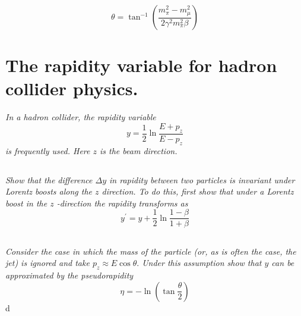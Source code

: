 \documentclass{article}
\begin{document}
$$\boxed{\theta=\tan ^{-1}\left(\frac{m_{\pi}^{2}-m_{\mu}^{2}}{2 \gamma^{2} m_{\pi}^{2} \beta}\right)}$$

\newpage


\section{The rapidity variable for hadron collider physics.}
\textit{In a hadron collider, the rapidity variable
$$
y=\frac{1}{2} \ln \frac{E+p_{z}}{E-p_{z}}
$$
is frequently used. Here $z$ is the beam direction.}


\subsection{}
\textit{Show that the difference $\Delta y$ in rapidity between two particles is invariant under Lorentz boosts along the $z$ direction. To do this, first show that under a Lorentz boost in the $z$ -direction the rapidity transforms as
$$
y^{\prime}=y+\frac{1}{2} \ln \frac{1-\beta}{1+\beta}
$$}


\subsection{}
\textit{Consider the case in which the mass of the particle (or, as is often the case, the jet) is ignored and take $p_{z} \approx E \cos \theta .$ Under this assumption show that $y$ can be approximated by the pseudorapidity
$$
\eta=-\ln \left(\tan \frac{\theta}{2}\right)
$$}d
\end{document}
